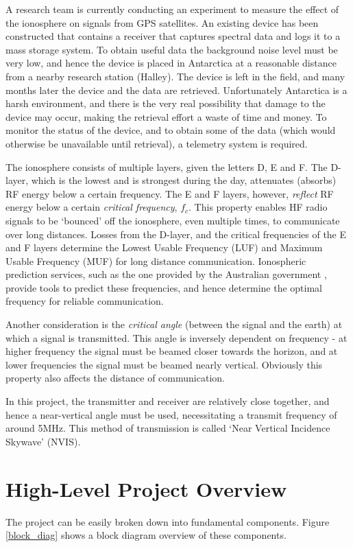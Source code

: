 \documentclass[a4paper,12pt]{article}
\begin{document}
A research team is currently conducting an experiment to measure the effect of the ionosphere on signals from GPS satellites. An existing device has been constructed that contains a receiver that captures spectral data and logs it to a mass storage system. To obtain useful data the background noise level must be very low, and hence the device is placed in Antarctica at a reasonable distance from a nearby research station (Halley). The device is left in the field, and many months later the device and the data are retrieved. Unfortunately Antarctica is a harsh environment, and there is the very real possibility that damage to the device may occur, making the retrieval effort a waste of time and money. To monitor the status of the device, and to obtain some of the data (which would otherwise be unavailable until retrieval), a telemetry system is required.

The ionosphere consists of multiple layers, given the letters D, E and F. The D-layer, which is the lowest and is strongest during the day, attenuates (absorbs) RF energy below a certain frequency. The E and F layers, however, \textit{reflect} RF energy below a certain \textit{critical frequency}, $f_c$. This property enables HF radio signals to be `bounced' off the ionosphere, even multiple times, to communicate over long distances. Losses from the D-layer, and the critical frequencies of the E and F layers determine the Lowest Usable Frequency (LUF) and Maximum Usable Frequency (MUF) for long distance communication. Ionospheric prediction services, such as the one provided by the Australian government \citep{ref:bom}, provide tools to predict these frequencies, and hence determine the optimal frequency for reliable communication.

Another consideration is the \textit{critical angle} (between the signal and the earth) at which a signal is transmitted. This angle is inversely dependent on frequency - at higher frequency the signal must be beamed closer towards the horizon, and at lower frequencies the signal must be beamed nearly vertical. Obviously this property also affects the distance of communication.

In this project, the transmitter and receiver are relatively close together, and hence a near-vertical angle must be used, necessitating a transmit frequency of around 5MHz. This method of transmission is called `Near Vertical Incidence Skywave' (NVIS).

\section{High-Level Project Overview}
The project can be easily broken down into fundamental components. Figure \ref{block_diag} shows a block diagram overview of these components. 
\end{document}
